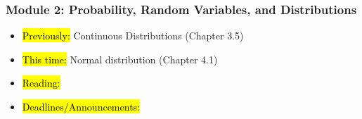 
\begin{frame}
    \frametitle{Module 2: Probability, Random Variables, and Distributions}
    \begin{itemize}
        \item \hl{Previously: } Continuous Distributions (Chapter 3.5)
        \item \hl{This time: } Normal distribution (Chapter 4.1)
        \item \hl{Reading: } 
        \item \hl{Deadlines/Announcements: } 
    \end{itemize}
    
\end{frame}
    